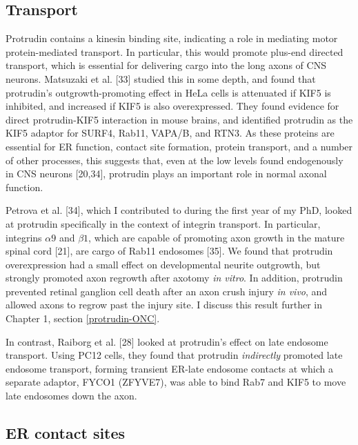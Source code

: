 \documentclass[
  12pt,
  a4paper,
]{book}
\begin{document}
\hypertarget{intro-ptdn-transport}{%
\subsection{Transport}\label{intro-ptdn-transport}}

Protrudin contains a kinesin binding site, indicating a role in mediating motor protein-mediated transport. In particular, this would promote plus-end directed transport, which is essential for delivering cargo into the long axons of CNS neurons. Matsuzaki et al. {[}33{]} studied this in some depth, and found that protrudin's outgrowth-promoting effect in HeLa cells is attenuated if KIF5 is inhibited, and increased if KIF5 is also overexpressed. They found evidence for direct protrudin-KIF5 interaction in mouse brains, and identified protrudin as the KIF5 adaptor for SURF4, Rab11, VAPA/B, and RTN3. As these proteins are essential for ER function, contact site formation, protein transport, and a number of other processes, this suggests that, even at the low levels found endogenously in CNS neurons {[}20,34{]}, protrudin plays an important role in normal axonal function.

Petrova et al. {[}34{]}, which I contributed to during the first year of my PhD, looked at protrudin specifically in the context of integrin transport. In particular, integrins \(\alpha9\) and \(\beta1\), which are capable of promoting axon growth in the mature spinal cord {[}21{]}, are cargo of Rab11 endosomes {[}35{]}. We found that protrudin overexpression had a small effect on developmental neurite outgrowth, but strongly promoted axon regrowth after axotomy \emph{in vitro}. In addition, protrudin prevented retinal ganglion cell death after an axon crush injury \emph{in vivo}, and allowed axons to regrow past the injury site. I discuss this result further in Chapter 1, section \ref{protrudin-ONC}.

In contrast, Raiborg et al. {[}28{]} looked at protrudin's effect on late endosome transport. Using PC12 cells, they found that protrudin \emph{indirectly} promoted late endosome transport, forming transient ER-late endosome contacts at which a separate adaptor, FYCO1 (ZFYVE7), was able to bind Rab7 and KIF5 to move late endosomes down the axon.

\hypertarget{er-contact-sites}{%
\subsection{ER contact sites}\label{er-contact-sites}}
\end{document}
